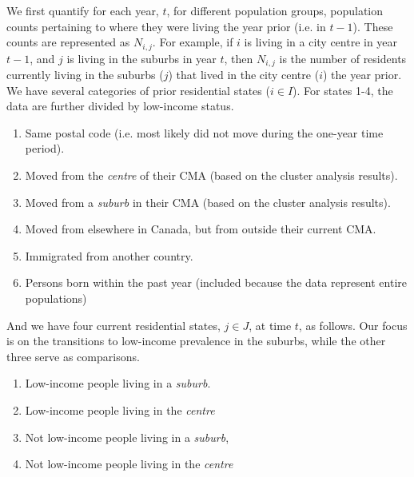 We first quantify for each year, $t$, for different population groups, population counts pertaining to where they were living the year prior (i.e. in $t-1$). These counts are represented as $N_{i,j}$. For example, if $i$ is living in a city centre in year $t-1$, and $j$ is living in the suburbs in year $t$, then $N_{i,j}$ is the number of residents currently living in the suburbs ($j$) that lived in the city centre ($i$) the year prior. We have several categories of prior residential states ($i \in I$). For states 1-4, the data are further divided by low-income status.



\begin{enumerate}
	\item Same postal code (i.e. most likely did not move during the one-year time period).
	\item Moved from the \textit{centre} of their CMA (based on the cluster analysis results).
	\item Moved from a \textit{suburb} in their CMA (based on the cluster analysis results).
	\item Moved from elsewhere in Canada, but from outside their current CMA.
	\item Immigrated from another country.
	\item Persons born within the past year (included because the data represent entire populations)
\end{enumerate}

And we have four current residential states, $j \in J$, at time $t$, as follows. Our focus is on the transitions to low-income prevalence in the suburbs, while the other three serve as comparisons. 

\begin{enumerate}
	\item Low-income people living in a \textit{suburb}. 
	
	\item Low-income people living in the \textit{centre}
	
	\item Not low-income people living in a \textit{suburb}, 
	
	\item Not low-income people living in the \textit{centre}
\end{enumerate}

